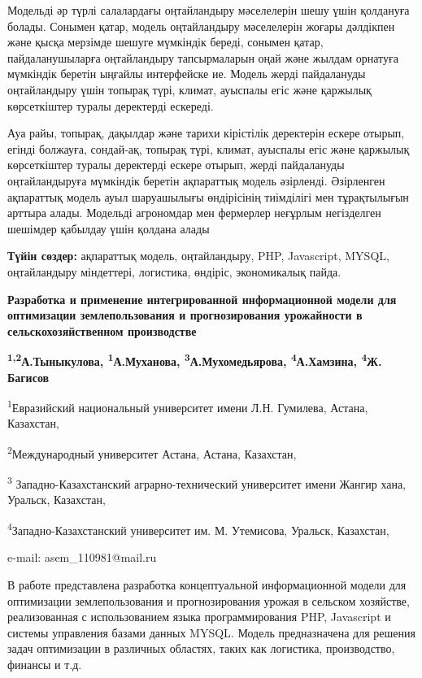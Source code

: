 Модельді әр түрлі салалардағы оңтайландыру мәселелерін шешу үшін
қолдануға болады. Сонымен қатар, модель оңтайландыру мәселелерін жоғары
дәлдікпен және қысқа мерзімде шешуге мүмкіндік береді, сонымен қатар,
пайдаланушыларға оңтайландыру тапсырмаларын оңай және жылдам орнатуға
мүмкіндік беретін ыңғайлы интерфейске ие. Модель жерді пайдалануды
оңтайландыру үшін топырақ түрі, климат, ауыспалы егіс және қаржылық
көрсеткіштер туралы деректерді ескереді.

Ауа райы, топырақ, дақылдар және тарихи кірістілік деректерін ескере
отырып, егінді болжауға, сондай-ақ, топырақ түрі, климат, ауыспалы егіс
және қаржылық көрсеткіштер туралы деректерді ескере отырып, жерді
пайдалануды оңтайландыруға мүмкіндік беретін ақпараттық модель
әзірленді. Әзірленген ақпараттық модель ауыл шаруашылығы өндірісінің
тиімділігі мен тұрақтылығын арттыра алады. Модельді агрономдар мен
фермерлер неғұрлым негізделген шешімдер қабылдау үшін қолдана алады

\textbf{Түйін сөздер:} ақпараттық модель, оңтайландыру, PHP, Javascript,
MYSQL, оңтайландыру міндеттері, логистика, өндіріс, экономикалық пайда.

\textbf{Разработка и применение интегрированной информационной модели
для оптимизации землепользования и прогнозирования урожайности в
сельскохозяйственном производстве}

\textbf{\textsuperscript{1,2}А.Тыныкулова,
\textsuperscript{1}А.Муханова, \textsuperscript{3}А.Мухомедьярова,
\textsuperscript{4}А.Хамзина, \textsuperscript{4}Ж. Багисов}

\textsuperscript{1}Евразийский национальный университет имени Л.Н.
Гумилева, Астана, Казахстан,

\textsuperscript{2}Международный университет Астана, Астана, Казахстан,

\textsuperscript{3} Западно-Казахстанский аграрно-технический
университет имени Жангир хана, Уральск, Казахстан,

\textsuperscript{4}Западно-Казахстанский университет им. М. Утемисова,
Уральск, Казахстан,

e-mail: asem\_110981@mail.ru

В работе представлена разработка концептуальной информационной модели
для оптимизации землепользования и прогнозирования урожая в сельском
хозяйстве, реализованная с использованием языка программирования PHP,
Javascript и системы управления базами данных MYSQL. Модель
предназначена для решения задач оптимизации в различных областях, таких
как логистика, производство, финансы и т.д.

